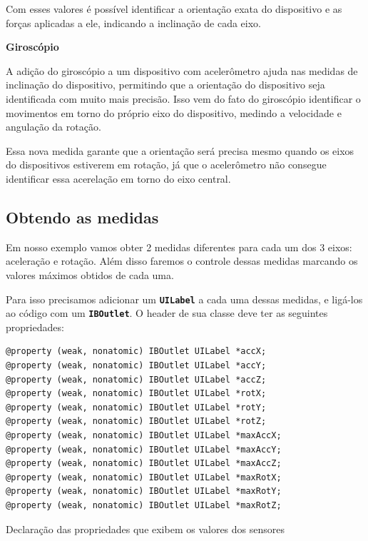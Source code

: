 \documentclass[a4paper,12pt,brazil,doubleside]{book}
\begin{document}
\begin{singlespace}
Com esses valores é possível identificar a orientação exata do dispositivo e as forças aplicadas a ele, indicando a inclinação de cada eixo.	

\textbf{Giroscópio}

A adição do giroscópio a um dispositivo com acelerômetro ajuda nas medidas de inclinação do dispositivo, permitindo que a orientação do dispositivo seja identificada com muito mais precisão. Isso vem do fato do giroscópio identificar o movimentos em torno do próprio eixo do dispositivo, medindo a velocidade e angulação da rotação.

Essa nova medida garante que a orientação será precisa mesmo quando os eixos do dispositivos estiverem em rotação, já que o acelerômetro não consegue identificar essa acerelação em torno do eixo central.

\subsection{Obtendo as medidas}

Em nosso exemplo vamos obter 2 medidas diferentes para cada um dos 3 eixos: aceleração e rotação. Além disso faremos o controle dessas medidas marcando os valores máximos obtidos de cada uma.

Para isso precisamos adicionar um \texttt{\textbf{UILabel}} a cada uma dessas medidas, e ligá-los ao código com um \texttt{\textbf{IBOutlet}}. O header de sua classe deve ter as seguintes propriedades:

\begin{listing}[H]
\begin{verbatim}
@property (weak, nonatomic) IBOutlet UILabel *accX;
@property (weak, nonatomic) IBOutlet UILabel *accY;
@property (weak, nonatomic) IBOutlet UILabel *accZ;
@property (weak, nonatomic) IBOutlet UILabel *rotX;
@property (weak, nonatomic) IBOutlet UILabel *rotY;
@property (weak, nonatomic) IBOutlet UILabel *rotZ;
@property (weak, nonatomic) IBOutlet UILabel *maxAccX;
@property (weak, nonatomic) IBOutlet UILabel *maxAccY;
@property (weak, nonatomic) IBOutlet UILabel *maxAccZ;
@property (weak, nonatomic) IBOutlet UILabel *maxRotX;
@property (weak, nonatomic) IBOutlet UILabel *maxRotY;
@property (weak, nonatomic) IBOutlet UILabel *maxRotZ;
\end{verbatim}
\caption{Declaração das propriedades que exibem os valores dos sensores}
\end{listing}



\end{singlespace}
\end{document}
